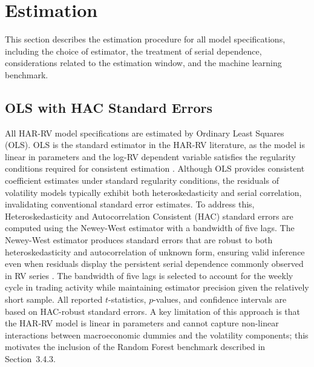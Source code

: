 \documentclass[12pt,a4paper]{report}
\begin{document}
\section{Estimation}
This section describes the estimation procedure for all model specifications, including the choice of estimator, the treatment of serial dependence, considerations related to the estimation window, and the machine learning benchmark.

\subsection{OLS with HAC Standard Errors}
All HAR-RV model specifications are estimated by Ordinary Least Squares (OLS). OLS is the standard estimator in the HAR-RV literature, as the model is linear in parameters and the log-RV dependent variable satisfies the regularity conditions required for consistent estimation \citep{Corsi2009, ClementsPreve2021}. Although OLS provides consistent coefficient estimates under standard regularity conditions, the residuals of volatility models typically exhibit both heteroskedasticity and serial correlation, invalidating conventional standard error estimates. To address this, Heteroskedasticity and Autocorrelation Consistent (HAC) standard errors are computed using the Newey-West estimator \citep{Newey1987} with a bandwidth of five lags. The Newey-West estimator produces standard errors that are robust to both heteroskedasticity and autocorrelation of unknown form, ensuring valid inference even when residuals display the persistent serial dependence commonly observed in RV series \citep{Andersen2003a}. The bandwidth of five lags is selected to account for the weekly cycle in trading activity while maintaining estimator precision given the relatively short sample. All reported $t$-statistics, $p$-values, and confidence intervals are based on HAC-robust standard errors. A key limitation of this approach is that the HAR-RV model is linear in parameters and cannot capture non-linear interactions between macroeconomic dummies and the volatility components; this motivates the inclusion of the Random Forest benchmark described in Section~3.4.3.
\end{document}
